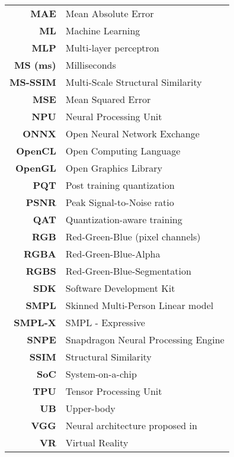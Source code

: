 \begin{changemargin}{-1.5cm}{0cm}
\begin{tabular}{>{\bf}r l@{}}
	MAE & Mean Absolute Error \\
	ML & Machine Learning \\
	MLP & Multi-layer perceptron \\
	MS (ms) & Milliseconds \\
	MS-SSIM & Multi-Scale Structural Similarity \\
	MSE & Mean Squared Error \\
	NPU & Neural Processing Unit \\
	ONNX & Open Neural Network Exchange \\
	OpenCL & Open Computing Language \\
	OpenGL & Open Graphics Library \\
	PQT & Post training quantization \\
	PSNR & Peak Signal-to-Noise ratio \\
	QAT & Quantization-aware training \\
	RGB & Red-Green-Blue (pixel channels) \\
	RGBA & Red-Green-Blue-Alpha \\
	RGBS & Red-Green-Blue-Segmentation \\
	SDK & Software Development Kit \\
	SMPL & Skinned Multi-Person Linear model \cite{dnn:smpl15} \\
	SMPL-X & SMPL - Expressive \cite{dnn:smplx19}\\
	SNPE & Snapdragon Neural Processing Engine \\
	SSIM & Structural Similarity \\
	SoC & System-on-a-chip \\
	TPU & Tensor Processing Unit \\
	UB & Upper-body \\
	VGG & Neural architecture proposed in \cite{dnn:vgg14}\\
	VR & Virtual Reality \\
\end{tabular}
\end{changemargin}

